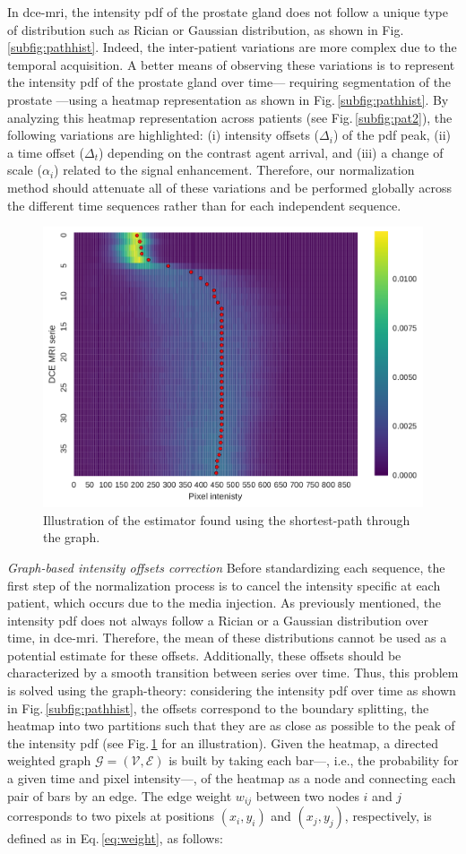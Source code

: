 \documentclass[a4paper,num-refs]{wiley-article}
\begin{document}
In \ac{dce}-\ac{mri}, the intensity \ac{pdf} of the prostate gland does not
follow a unique type of distribution such as Rician or Gaussian distribution,
as shown in Fig.\,\ref{subfig:pathhist}. Indeed, the inter-patient variations
are more complex due to the temporal acquisition. A better means of observing
these variations is to represent the intensity \ac{pdf} of the prostate gland
over time--- requiring segmentation of the prostate ---using a heatmap
representation as shown in Fig.\,\ref{subfig:pathhist}. By analyzing this
heatmap representation across patients (see Fig.\,\ref{subfig:pat2}), the
following variations are highlighted: (i) intensity offsets ($\Delta_i$) of the
\ac{pdf} peak, (ii) a time offset ($\Delta_t$) depending on the contrast agent
arrival, and (iii) a change of scale ($\alpha_i$) related to the signal
enhancement. Therefore, our normalization method should attenuate all of these
variations and be performed globally across the different time sequences rather
than for each independent sequence.

\begin{figure}
  \centering
  \includegraphics[width=0.45\linewidth]{images/DCE-normalization/estimator.pdf}
  \caption{Illustration of the estimator found using the shortest-path through
    the graph.}
  \label{fig:estimator}
\end{figure}

\emph{Graph-based intensity offsets correction} Before standardizing each
sequence, the first step of the normalization process is to cancel the
intensity specific at each patient, which occurs due to the media injection. As
previously mentioned, the intensity \ac{pdf} does not always follow a Rician or
a Gaussian distribution over time, in \ac{dce}-\ac{mri}. Therefore, the mean of
these distributions cannot be used as a potential estimate for these
offsets. Additionally, these offsets should be characterized by a smooth
transition between series over time.  Thus, this problem is solved using the
graph-theory: considering the intensity \ac{pdf} over time as shown in
Fig.\,\ref{subfig:pathhist}, the offsets correspond to the boundary splitting,
the heatmap into two partitions such that they are as close as possible to the
peak of the intensity \ac{pdf} (see Fig.\,\ref{fig:estimator} for an
illustration). Given the heatmap, a directed weighted graph
$\mathcal{G}=(\mathcal{V}, \mathcal{E})$ is built by taking each bar---, i.e.,
the probability for a given time and pixel intensity---, of the heatmap as a
node and connecting each pair of bars by an edge. The edge weight $w_{ij}$
between two nodes $i$ and $j$ corresponds to two pixels at positions
$(x_i, y_i)$ and $(x_j, y_j)$, respectively, is defined as in
Eq.\,\eqref{eq:weight}, as follows:
\end{document}
